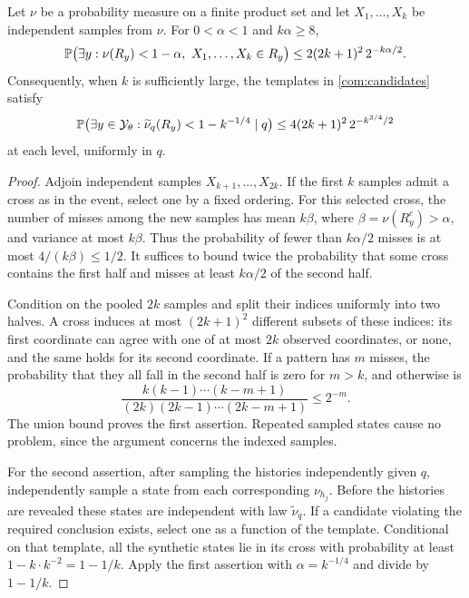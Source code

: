 \begin{lemma}\label{com:ghost}
Let \(\nu\) be a probability measure on a finite product set and let
\(X_1,\ldots,X_k\) be independent samples from \(\nu\). For
\(0<\alpha<1\) and \(k\alpha\ge8\),
\[
 \mathbb P\bigl(\exists y:\nu(R_y)<1-\alpha,
                    \ X_1,\ldots,X_k\in R_y\bigr)
 \le 2(2k+1)^2\,2^{-k\alpha/2}.
\]
Consequently, when \(k\) is sufficiently large, the templates in
\eqref{com:candidates} satisfy
\begin{equation}\label{com:mixture}
 \mathbb P\bigl(\exists y\in\mathcal Y_\theta:
              \widetilde\nu_q(R_y)<1-k^{-1/4}\mid q\bigr)
 \le 4(2k+1)^2\,2^{-k^{3/4}/2}
\end{equation}
at each level, uniformly in \(q\).
\end{lemma}

\begin{proof}
Adjoin independent samples \(X_{k+1},\ldots,X_{2k}\). If the first \(k\)
samples admit a cross as in the event, select one by a fixed ordering. For this
selected cross, the number of misses among the new samples has mean
\(k\beta\), where \(\beta=\nu(R_y^c)>\alpha\), and variance at most
\(k\beta\). Thus the probability of fewer than \(k\alpha/2\) misses is at
most \(4/(k\beta)\le1/2\). It suffices to bound twice the probability that
some cross contains the first half and misses at least \(k\alpha/2\) of the
second half.

Condition on the pooled \(2k\) samples and split their indices uniformly into
two halves. A cross induces at most \((2k+1)^2\) different subsets of these
indices: its first coordinate can agree with one of at most \(2k\) observed
coordinates, or none, and the same holds for its second coordinate. If a
pattern has \(m\) misses, the probability that they all fall in the second
half is zero for \(m>k\), and otherwise is
\[
 \frac{k(k-1)\cdots(k-m+1)}{(2k)(2k-1)\cdots(2k-m+1)}
 \le 2^{-m}.
\]
The union bound proves the first assertion. Repeated sampled states cause no
problem, since the argument concerns the indexed samples.

For the second assertion, after sampling the histories independently given
\(q\), independently sample a state from each corresponding \(\nu_{h_j}\).
Before the histories are revealed these states are independent with law
\(\widetilde\nu_q\). If a candidate violating the required conclusion exists,
select one as a function of the template. Conditional on that template, all
the synthetic states lie in its cross with probability at least
\(1-k\cdot k^{-2}=1-1/k\). Apply the first assertion with
\(\alpha=k^{-1/4}\) and divide by \(1-1/k\).
\end{proof}

